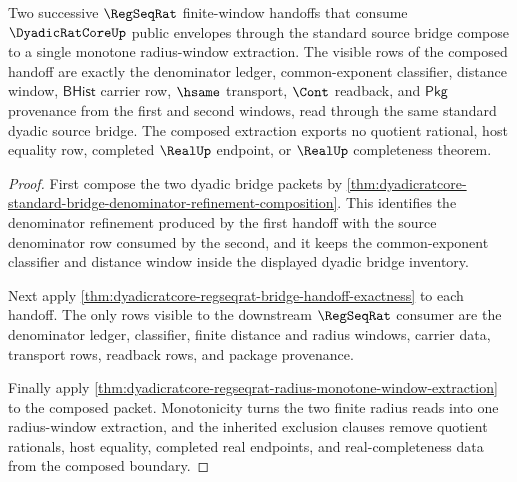 \begin{theorem}
\label{thm:dyadicratcore-regseqrat-radius-window-composition}
Two successive $\RegSeqRat$ finite-window handoffs that consume
$\DyadicRatCoreUp$ public envelopes through the standard source bridge compose
to a single monotone radius-window extraction. The visible rows of the composed
handoff are exactly the denominator ledger, common-exponent classifier, distance
window, $\mathsf{BHist}$ carrier row, $\hsame$ transport, $\Cont$ readback, and
$\mathsf{Pkg}$ provenance from the first and second windows, read through the
same standard dyadic source bridge. The composed extraction exports no quotient
rational, host equality row, completed $\RealUp$ endpoint, or $\RealUp$
completeness theorem.
\end{theorem}
\begin{proof}
First compose the two dyadic bridge packets by
\autoref{thm:dyadicratcore-standard-bridge-denominator-refinement-composition}.
This identifies the denominator refinement produced by the first handoff with
the source denominator row consumed by the second, and it keeps the
common-exponent classifier and distance window inside the displayed dyadic
bridge inventory.

Next apply \autoref{thm:dyadicratcore-regseqrat-bridge-handoff-exactness} to
each handoff. The only rows visible to the downstream $\RegSeqRat$ consumer are
the denominator ledger, classifier, finite distance and radius windows,
carrier data, transport rows, readback rows, and package provenance.

Finally apply
\autoref{thm:dyadicratcore-regseqrat-radius-monotone-window-extraction} to the
composed packet. Monotonicity turns the two finite radius reads into one
radius-window extraction, and the inherited exclusion clauses remove quotient
rationals, host equality, completed real endpoints, and real-completeness data
from the composed boundary.
\end{proof}

